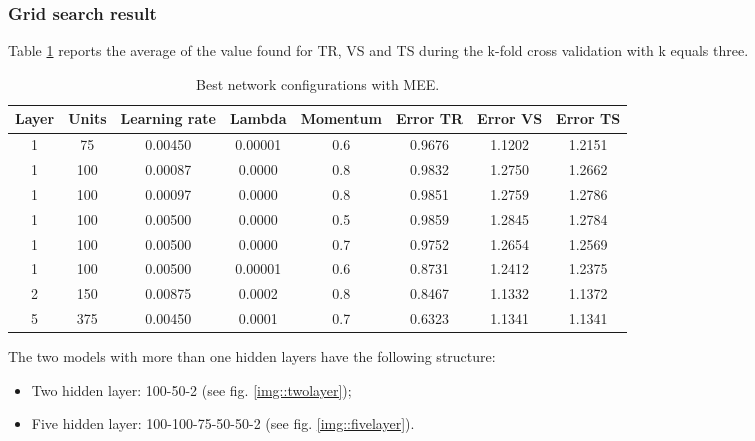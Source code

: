\subsubsection{Grid search result}
Table \ref{tab:best_nets} reports the average of the value found for TR, VS and TS during the k-fold cross validation with k equals three.   
\begin{center}
\small\addtolength{\tabcolsep}{-3pt}
\begin{table}[h!]
	\centering
	\begin{tabular}{|c|c|c|c|c|c|c|c|}
		\hline
		\textbf{Layer}& \textbf{Units}& \textbf{Learning rate} & \multicolumn{1}{l|}{\textbf{Lambda}} & \textbf{Momentum} & \textbf{Error TR}& \textbf{Error VS}& \textbf{Error TS}\\ \hline
			1 & 75 & 0.00450 & 0.00001 & 0.6  & 0.9676 & 1.1202 & 1.2151  \\
			1 & 100 & 0.00087 & 0.0000 & 0.8  & 0.9832 & 1.2750 &  1.2662\\
			1 & 100 & 0.00097 & 0.0000 & 0.8  & 0.9851 & 1.2759 &  1.2786\\
			1 & 100 & 0.00500 & 0.0000 & 0.5  & 0.9859 & 1.2845 & 1.2784 \\
			1 & 100 & 0.00500 & 0.0000 & 0.7  & 0.9752 & 1.2654 & 1.2569 \\
			1 & 100 & 0.00500 & 0.00001 & 0.6  & 0.8731& 1.2412 & 1.2375 \\
			2 & 150 & 0.00875 & 0.0002 & 0.8  & 0.8467 & 1.1332 &  1.1372 \\
			5 & 375 & 0.00450 & 0.0001 & 0.7  & 0.6323 & 1.1341 &  1.1341 \\
		  \hline
	\end{tabular}
		\caption{Best network configurations with MEE.}
		\label{tab:best_nets}
\end{table}
\end{center}
The two models with more than one hidden layers have the following structure:
\begin{itemize}
	\item Two hidden layer: 100-50-2 (see fig. \ref{img::twolayer});
	\item Five hidden layer: 100-100-75-50-50-2 (see fig. \ref{img::fivelayer}).
\end{itemize}

